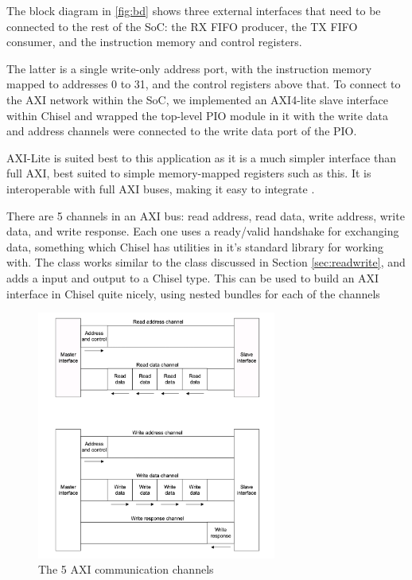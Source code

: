The block diagram in \ref{fig:bd} shows three external interfaces that need to be connected to the rest of the SoC: the RX FIFO producer, the TX FIFO consumer, and the instruction memory and control registers.

The latter is a single write-only address port, with the instruction memory mapped to addresses 0 to 31, and the control registers above that. To connect to the AXI network within the SoC, we implemented an AXI4-lite slave interface within Chisel and wrapped the top-level PIO module in it with the write data and address channels were connected to the write data port of the PIO.

AXI-Lite is suited best to this application as it is a much simpler interface than full AXI, best suited to simple memory-mapped registers such as this. It is interoperable with full AXI buses, making it easy to integrate \cite{axi}.

There are 5 channels in an AXI bus: read address, read data, write address, write data, and write response. Each one uses a ready/valid handshake for exchanging data, something which Chisel has utilities in it's standard library for working with. The  class works similar to the  class discussed in Section \ref{sec:readwrite}, and adds a  input and  output to a Chisel  type. This can be used to build an AXI interface in Chisel quite nicely, using nested bundles for each of the channels

\begin{figure}[H]
    \centering
    \includegraphics[width=0.7\textwidth]{../img/axi-chan.png}
    \caption{The 5 AXI communication channels}
    \label{fig:axi-chan}
\end{figure}

